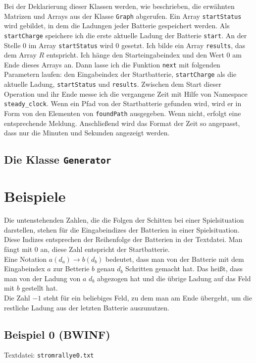 \documentclass[a4paper,10pt,ngerman]{scrartcl}
\begin{document}
Bei der Deklarierung dieser Klassen werden, wie beschrieben, die erwähnten Matrizen und Arrays aus der Klasse \texttt{Graph}
abgerufen. Ein Array \texttt{startStatus} wird gebildet, in dem die Ladungen jeder Batterie gespeichert werden. 
Als \texttt{startCharge} speichere ich die erste aktuelle Ladung der Batterie \texttt{start}. An der Stelle 0 im Array
\texttt{startStatus} wird 0 gesetzt. Ich bilde ein Array \texttt{results}, das dem Array $R$ entspricht.
Ich hänge den Starteingabeindex und den Wert 0 am Ende dieses Arrays an. Dann lasse ich die Funktion \texttt{next} mit
folgenden Parametern laufen: den Eingabeindex der Startbatterie, \texttt{startCharge} als die aktuelle Ladung, \texttt{startStatus}
und \texttt{results}. Zwischen dem Start dieser Operation und ihr Ende messe ich die vergangene Zeit mit Hilfe von 
Namespace \texttt{steady\_clock}. Wenn ein Pfad von der Startbatterie gefunden wird, wird er in Form von den Elementen von
\texttt{foundPath} ausgegeben. Wenn nicht, erfolgt eine entsprechende Meldung. Anschließend wird das Format der Zeit so angepasst, 
dass nur die Minuten und Sekunden angezeigt werden.

\subsection{Die Klasse \texttt{Generator}}


\newpage
\section{Beispiele}
Die untenstehenden Zahlen, die die Folgen der Schitten bei einer Spielsituation darstellen, stehen für die Eingabeindizes
der Batterien in einer Spielsituation. Diese Indizes entsprechen der Reihenfolge der Batterien in der Textdatei. Man fängt mit 0 an,
diese Zahl entspricht der Startbatterie.\\
Eine Notation $a(d_a) \rightarrow b(d_b)$ bedeutet, dass man von der Batterie mit dem Eingabeindex $a$ zur Betterie $b$ genau $d_b$ Schritten
gemacht hat. Das heißt, dass man von der Ladung von $a$ $d_b$ abgezogen hat und die übrige Ladung auf das Feld mit $b$ gestellt hat.\\
Die Zahl $-1$ steht für ein beliebiges Feld, zu dem man am Ende übergeht, um die restliche Ladung aus der letzten Batterie auszunutzen.

\subsection{Beispiel 0 (BWINF)}\label{example:0}
Textdatei: \texttt{stromrallye0.txt}\\
\end{document}
